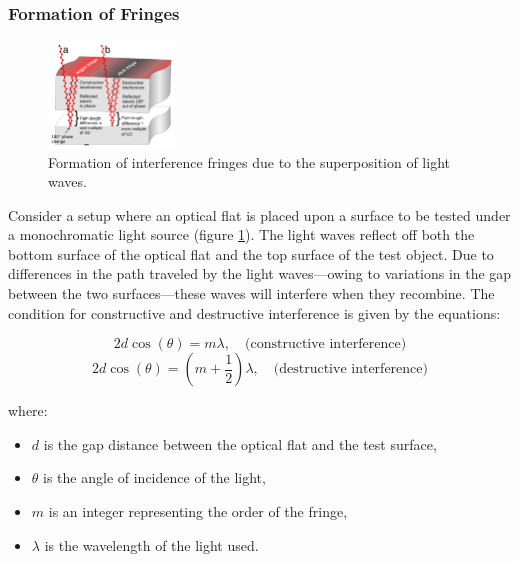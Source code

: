 \documentclass[../main.tex]{subfiles}
\begin{document}
\subsubsection{Formation of Fringes}
\vspace{-15pt}
\begin{minipage}{\textwidth}
\begin{figure}%
    \vspace{\dimexpr0.3\baselineskip-\topskip}%
    \noindent
    \includegraphics[width=0.3\textwidth]{Images/Introduction/Optical_flat_interference}
    \vspace{-8pt}
    \caption{Formation of interference fringes due to the superposition of light waves.\cite{enwiki:1212101911}}
    \label{fig:interference_fringes}
\end{figure}
Consider a setup where an optical flat is placed upon a surface to be tested under a monochromatic light source (figure \ref{fig:interference_fringes}). The light waves reflect off both the bottom surface of the optical flat and the top surface of the test object. Due to differences in the path traveled by the light waves—owing to variations in the gap between the two surfaces—these waves will interfere when they recombine. The condition for constructive and destructive interference is given by the equations:
\end{minipage}

\begin{minipage}{0.6\textwidth}
\begin{equation}
2d \cos(\theta) = m\lambda, \quad \text{(constructive interference)}
\end{equation}
\begin{equation}
2d \cos(\theta) = (m + \frac{1}{2})\lambda, \quad \text{(destructive interference)}
\end{equation}
\end{minipage}
\newline
\begin{minipage}{0.7\textwidth}
where:
\begin{itemize}
    \setlength{\itemsep}{0.1mm}
    \item \(d\) is the gap distance between the optical flat and the test surface,
    \item \(\theta\) is the angle of incidence of the light,
    \item \(m\) is an integer representing the order of the fringe,
    \item \(\lambda\) is the wavelength of the light used.
\end{itemize}

\end{minipage}
\end{document}
